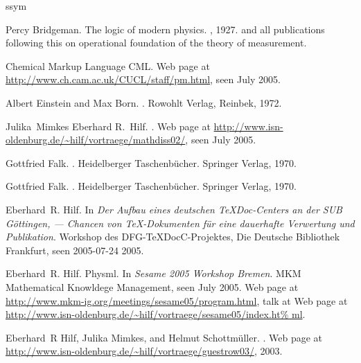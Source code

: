 ssym\documentclass{llncs}
\def\seen{seen }
\def\July{July }
\def\webpageat{Web page at }
\begin{document}
%
%
\begin{thebibliography}{Koh06b}

Percy Bridgeman.
\newblock The logic of modern physics.
, 1927.
\newblock and all publications following this on operational foundation of the
  theory of measurement.

{Chemical Markup Language CML}.
\newblock \webpageat\url{http://www.ch.cam.ac.uk/CUCL/staff/pm.html},
  \seen\July 2005.

Albert Einstein and Max Born.
.
\newblock Rowohlt Verlag, Reinbek, 1972.

Julika~Mimkes Eberhard R.~Hilf.
.
\newblock
  \webpageat\url{http://www.isn-oldenburg.de/~hilf/vortraege/mathdiss02/},
  \seen\July 2005.

Gottfried Falk.
.
\newblock Heidelberger Taschenb\"ucher. Springer Verlag, 1970.

Gottfried Falk.
.
\newblock Heidelberger Taschenb\"ucher. Springer Verlag, 1970.

Eberhard~R. Hilf.
\newblock In {\em {Der Aufbau eines deutschen TeXDoc-Centers an der SUB
  G\"ottingen, --- Chancen von TeX-Dokumenten f\"ur eine dauerhafte Verwertung
  und Publikation}}. {Workshop des DFG-TeXDocC-Projektes, Die Deutsche
  Bibliothek Frankfurt}, \seen 2005-07-24 2005.

Eberhard~R. Hilf.
\newblock Physml.
\newblock In {\em Sesame 2005 Workshop Bremen}. MKM Mathematical Knowldege
  Management, \seen\July 2005.
\newblock \webpageat\url{http://www.mkm-ig.org/meetings/sesame05/program.html},
  talk at
  \webpageat\url{http://www.isn-oldenburg.de/~hilf/vortraege/sesame05/index.ht%
ml}.

Eberhard~R Hilf, Julika Mimkes, and Helmut Schottm\"uller.
.
\newblock \webpageat
  \url{http://www.isn-oldenburg.de/~hilf/vortraege/guestrow03/}, 2003.


\end{thebibliography}
\end{document}
